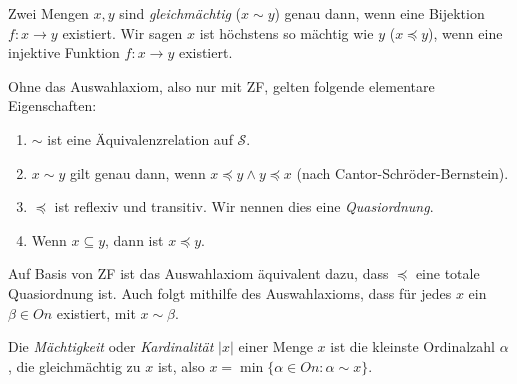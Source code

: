 \begin{definition}
	Zwei Mengen $x,y$ sind \textit{gleichmächtig} ($x\sim y$) genau dann, wenn eine Bijektion $f:x\to y$ existiert. Wir sagen $x$ ist höchstens so mächtig wie $y$ ($x\preceq y$), wenn eine injektive Funktion $f:x\to y$ existiert.
\end{definition}

\begin{lemma}
	Ohne das Auswahlaxiom, also nur mit ZF, gelten folgende elementare Eigenschaften:
	\begin{enumerate}
		\item $\sim$ ist eine Äquivalenzrelation auf $\mathcal{S}$.
		\item $x\sim y$ gilt genau dann, wenn $x\preceq y \land y \preceq x$ (nach Cantor-Schröder-Bernstein).
		\item $\preceq$ ist reflexiv und transitiv. Wir nennen dies eine \textit{Quasiordnung}.
		\item Wenn $x\subseteq y$, dann ist $x\preceq y$.
	\end{enumerate}
\end{lemma}

Auf Basis von ZF ist das Auswahlaxiom äquivalent dazu, dass $\preceq$ eine totale Quasiordnung ist. Auch folgt mithilfe des Auswahlaxioms, dass für jedes $x$ ein $\beta\in On$ existiert, mit $x\sim\beta$.

\begin{definition}[Kardinalität]
	Die \textit{Mächtigkeit} oder \textit{Kardinalität} $\vert x \vert$ einer Menge $x$ ist die kleinste Ordinalzahl $\alpha$, die gleichmächtig zu $x$ ist, also $x=\min\{\alpha\in On : \alpha\sim x\}$.
\end{definition}

